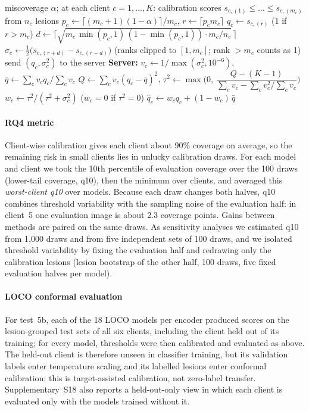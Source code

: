 \begin{algorithm}[!t]
\caption{EB-ShrinkFCP: per-client conformal thresholds with empirical-Bayes shrinkage.}
\label{alg:eb}
\begin{algorithmic}[1]
\Require miscoverage $\alpha$; at each client $c=1,\dots,K$: calibration scores $s_{c,(1)}\le\dots\le s_{c,(m_c)}$ from $n_c$ lesions
  \State $p_c \gets \lceil (m_c+1)(1-\alpha)\rceil/m_c$, \quad $r \gets \lceil p_c m_c\rceil$
  \State $q_c \gets s_{c,(r)}$ \quad (1 if $r>m_c$)
  \State $d \gets \big\lceil \sqrt{m_c\,\min(p_c,1)\,(1-\min(p_c,1))\cdot m_c/n_c}\,\big\rceil$
  \State $\sigma_c \gets \tfrac12\big(s_{c,(r+d)}-s_{c,(r-d)}\big)$ \quad (ranks clipped to $[1,m_c]$; rank $>m_c$ counts as 1)
  \State send $(q_c,\sigma_c^2)$ to the server
\EndFor
\State \textbf{Server:} $v_c \gets 1/\max(\sigma_c^2,10^{-6})$, \quad $\bar q \gets \sum_c v_c q_c / \sum_c v_c$
\State $Q \gets \sum_c v_c (q_c-\bar q)^2$, \quad $\tau^2 \gets \max\!\Big(0,\ \dfrac{Q-(K-1)}{\sum_c v_c-\sum_c v_c^2/\sum_c v_c}\Big)$
  \State $w_c \gets \tau^2/(\tau^2+\sigma_c^2)$ \quad ($w_c=0$ if $\tau^2=0$)
  \State $\hat q_c \gets w_c q_c + (1-w_c)\,\bar q$ 
\EndFor
\end{algorithmic}
\end{algorithm}

\paragraph{RQ4 metric} Client-wise calibration gives each client about 90\% coverage on average, so the
remaining risk in small clients lies in unlucky calibration draws. For each model and client we took the
10th percentile of evaluation coverage over the 100 draws (lower-tail coverage, q10), then the minimum over
clients, and averaged this \emph{worst-client q10} over models. Because each draw changes both halves,
q10 combines threshold variability with the sampling noise of the evaluation half: in client~5 one
evaluation image is about 2.3 coverage points. Gains between methods are paired on the same draws. As
sensitivity analyses we estimated q10 from 1,000 draws and from five independent sets of 100 draws, and we
isolated threshold variability by fixing the evaluation half and redrawing only the calibration lesions
(lesion bootstrap of the other half, 100 draws, five fixed evaluation halves per model).

\paragraph{LOCO conformal evaluation} For test~5b, each of the 18 LOCO models per encoder produced scores on
the lesion-grouped test sets of all six clients, including the client held out of its training; for every
model, thresholds were then calibrated and evaluated as above. The held-out client is therefore unseen in
classifier training, but its validation labels enter temperature scaling and its labelled lesions enter conformal calibration; this is target-assisted calibration, not zero-label transfer. Supplementary~S18 also reports a held-out-only view in which each client is evaluated only with the models trained without it.

